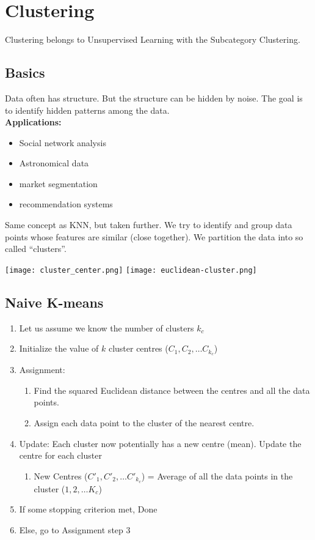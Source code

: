 \section{Clustering}
Clustering belongs to Unsupervised Learning with the Subcategory Clustering.

\subsection{Basics}
Data often has structure. 
But the structure can be hidden by noise.
The goal is to identify hidden patterns among the data.\\
\textbf{Applications:}
\begin{itemize}
  \item Social network analysis
  \item Astronomical data
  \item market segmentation
  \item recommendation systems
\end{itemize}
Same concept as KNN, but taken further.
We try to identify and group data points whose features are similar (close together).
We partition the data into so called ``clusters''.

\texttt{[image: cluster\_center.png]}
\texttt{[image: euclidean-cluster.png]}

\subsection{Naive K-means}
\begin{enumerate}
  \item Let us assume we know the number of clusters $k_c$
  \item Initialize the value of $k$ cluster centres ($C_1,C_2,\dots C_{k_c}$)
  \item Assignment:
  \begin{enumerate}
    \item Find the squared Euclidean distance between the centres and all the data points.
    \item Assign each data point to the cluster of the nearest centre.
  \end{enumerate}
  \item Update: Each cluster now potentially has a new centre (mean). Update the centre for each cluster
  \begin{enumerate}
    \item New Centres ($C'_1,C'_2,\dots C'_{k_c}$) = Average of all the data points in the cluster ($1,2, \dots K_c$)
  \end{enumerate}
  \item If some stopping criterion met, Done
  \item Else, go to Assignment step 3
\end{enumerate}

